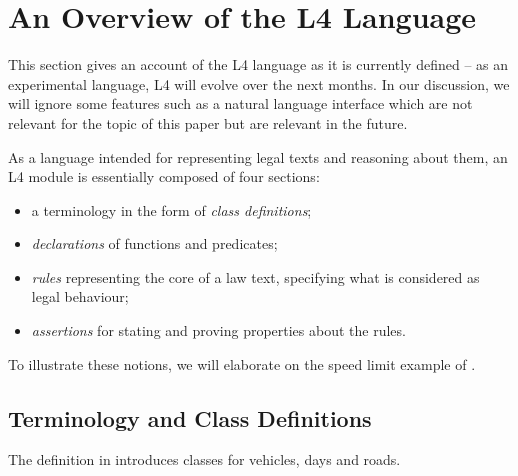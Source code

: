 
\section{An Overview of the L4 Language}\label{sec:l4_language_app}

This section gives an account of the L4 language as it is currently defined --
as an experimental language, L4 will evolve over the next months. In our
discussion, we will ignore some features such as a natural language interface
\citep{listemnmaa2021cnl} which are not relevant for the topic of this paper
but are relevant in the future.

As a language intended for representing legal texts and reasoning about them,
an L4 module is essentially composed of four sections:
\begin{itemize}
\item a terminology in the form of \emph{class definitions};
\item \emph{declarations} of functions and predicates;
\item \emph{rules} representing the core of a law text, specifying what is
  considered as legal behaviour;
\item \emph{assertions} for stating and proving properties about the rules.
\end{itemize}

To illustrate these notions, we will elaborate on the speed limit example of
. 









\subsection{Terminology and Class Definitions}\label{sec:classdefs}

The definition in  introduces classes for vehicles, days
and roads. 

